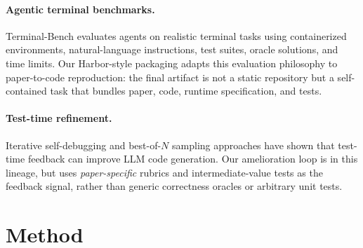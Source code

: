 \documentclass[11pt]{article}
\begin{document}
\paragraph{Agentic terminal benchmarks.} Terminal-Bench
\citep{tbench2025} evaluates agents on realistic terminal tasks
using containerized environments, natural-language instructions,
test suites, oracle solutions, and time limits. Our Harbor-style
packaging adapts this evaluation philosophy to paper-to-code
reproduction: the final artifact is not a static repository but a
self-contained task that bundles paper, code, runtime
specification, and tests.

\paragraph{Test-time refinement.} Iterative self-debugging
\citep{chen2023selfdebug,zhong2024debugbench} and best-of-$N$
sampling approaches \citep{brown2024largelanguagemonkeys} have
shown that test-time feedback can improve LLM code generation.
Our amelioration loop is in this lineage, but uses
\emph{paper-specific} rubrics and intermediate-value tests as the
feedback signal, rather than generic correctness oracles or
arbitrary unit tests.

\section{Method}
\end{document}
